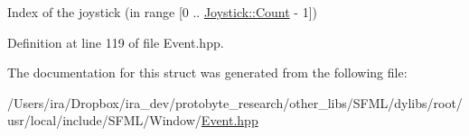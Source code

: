 Index of the joystick (in range \mbox{[}0 .. \hyperlink{classsf_1_1_joystick_ac4ca4ee36e2cf04ecf931316e4463ca6a6e0a2a95bc1da277610c04d80f52715e}{Joystick\-::\-Count} -\/ 1\mbox{]}) 



Definition at line 119 of file Event.\-hpp.



The documentation for this struct was generated from the following file\-:\begin{DoxyCompactItemize}
\item 
/\-Users/ira/\-Dropbox/ira\-\_\-dev/protobyte\-\_\-research/other\-\_\-libs/\-S\-F\-M\-L/dylibs/root/usr/local/include/\-S\-F\-M\-L/\-Window/\hyperlink{_event_8hpp}{Event.\-hpp}\end{DoxyCompactItemize}
